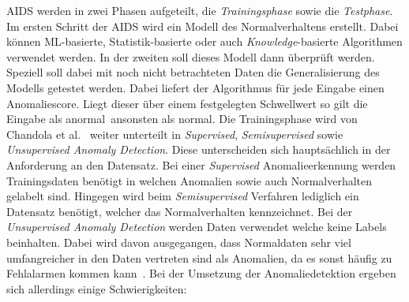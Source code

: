                 \ac{AIDS} werden in zwei Phasen aufgeteilt,
                die \textit{Trainingsphase} sowie die \textit{Testphase}.
                Im ersten Schritt der \ac{AIDS} wird ein Modell des Normalverhaltens erstellt.
                Dabei können ML-basierte, Statistik-basierte oder auch 
                \textit{Knowledge}-basierte  Algorithmen verwendet werden.
                In der zweiten soll dieses Modell dann überprüft werden.
                Speziell soll dabei mit noch nicht betrachteten Daten die Generalisierung des Modells getestet werden. 
                Dabei liefert der Algorithmus für jede Eingabe einen Anomaliescore.
                Liegt dieser über einem festgelegten Schwellwert so gilt die Eingabe als 
                \glqq anormal\grqq \ ansonsten als \glqq normal\grqq.
                Die Trainingsphase wird von Chandola et al.~\cite{ANOMALYSURVEY} weiter unterteilt in \textit{Supervised},
                \textit{Semisupervised} sowie \textit{Unsupervised Anomaly Detection}.
                Diese unterscheiden sich hauptsächlich in der Anforderung an den Datensatz. 
                Bei einer \textit{Supervised} Anomalieerkennung werden Trainingsdaten benötigt 
                in welchen Anomalien sowie auch Normalverhalten gelabelt sind.
                Hingegen wird beim \textit{Semisupervised} Verfahren lediglich ein Datensatz benötigt,
                welcher das Normalverhalten kennzeichnet.
                Bei der \textit{Unsupervised Anomaly Detection} werden Daten verwendet welche keine Labels beinhalten.
                Dabei wird davon ausgegangen, dass Normaldaten sehr viel umfangreicher in den Daten vertreten sind als Anomalien,
                da es sonst häufig zu Fehlalarmen kommen kann~\cite{ANOMALYSURVEY2}.
                Bei der Umsetzung der Anomaliedetektion ergeben sich allerdings einige Schwierigkeiten:
